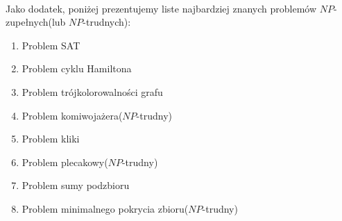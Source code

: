 \\ \noindent
Jako dodatek, poniżej prezentujemy liste najbardziej znanych problemów $NP$-zupełnych(lub $NP$-trudnych):
\begin{enumerate}
\item Problem SAT
\item Problem cyklu Hamiltona
\item Problem trójkolorowalności grafu
\item Problem komiwojażera($NP$-trudny)
\item Problem kliki
\item Problem plecakowy($NP$-trudny)
\item Problem sumy podzbioru
\item Problem minimalnego pokrycia zbioru($NP$-trudny)
\end{enumerate}

 
\noindent
